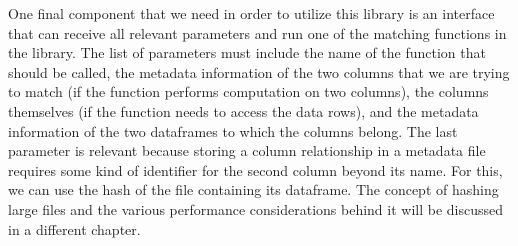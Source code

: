 One final component that we need in order to utilize this library is an interface that can receive all relevant parameters
and run one of the matching functions in the library.
The list of parameters must include the name of the function that should be called, the metadata information of the two columns
that we are trying to match (if the function performs computation on two columns), the columns themselves (if the function needs
to access the data rows), and the metadata information of the two dataframes to which the columns belong.
The last parameter is relevant because storing a column relationship in a metadata file requires some kind of identifier for
the second column beyond its name.
For this, we can use the hash of the file containing its dataframe.
The concept of hashing large files and the various performance considerations behind it will be discussed in a different chapter.
